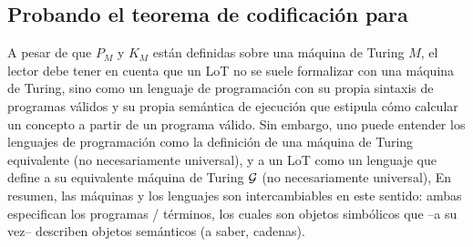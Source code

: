 \subsection{Probando el teorema de codificación para \boldmath{$\geom$}}


A pesar de que $P_M$ y $K_M$ están definidas sobre una máquina de Turing $M$, el lector debe tener en cuenta que un LoT no se suele formalizar con una máquina de Turing, sino como un lenguaje de programación con su propia sintaxis de programas válidos y su propia semántica de ejecución que estipula cómo calcular un concepto a partir de un programa válido. Sin embargo, uno puede entender los lenguajes de programación como la definición de una máquina de Turing equivalente (no necesariamente universal), y a un LoT como un lenguaje que define a su equivalente máquina de Turing $\gram$ (no necesariamente universal), En resumen, las máquinas y los lenguajes son intercambiables en este  sentido: ambas especifican los programas / términos, los cuales son objetos simbólicos que --a su vez-- describen objetos semánticos (a saber, cadenas). 


